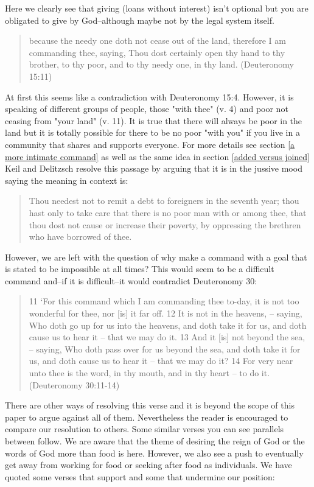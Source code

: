 \documentclass[11pt]{article}
\begin{document}
\noindent Here we clearly see that giving (loans without interest) isn't optional but you are obligated to give by God--although maybe not by the legal system itself.
\begin{quote}
because the needy one doth not cease out of the land, therefore I am commanding thee, saying, Thou dost certainly open thy hand to thy brother, to thy poor, and to thy needy one, in thy land. (Deuteronomy 15:11)
\end{quote}
At first this seems like a contradiction with Deuteronomy 15:4. However, it is speaking of different groups of people, those "with thee" (v. 4) and poor not ceasing from "your land" (v. 11). It is true that there will always be poor in the land but it is totally possible for there to be no poor "with you" if you live in a community that shares and supports everyone. For more details see section \ref{a more intimate command} as well as the same idea in section \ref{added versus joined}
Keil and Delitzsch resolve this passage by arguing that it is in the jussive mood saying the meaning in context is: 
\begin{quote}
Thou needest not to remit a debt to foreigners in the seventh year; thou hast only to take care that there is no poor man with or among thee, that thou dost not cause or increase their poverty, by oppressing the brethren who have borrowed of thee. \cite{jussive mood kd}
\end{quote}
However, we are left with the question of why make a command with a goal that is stated to be impossible at all times? This would seem to be a difficult command and--if it is difficult--it would contradict Deuteronomy 30:
\begin{quote}
11 `For this command which I am commanding thee to-day, it is not too wonderful for thee, nor [is] it far off.
12 It is not in the heavens, -- saying, Who doth go up for us into the heavens, and doth take it for us, and doth cause us to hear it -- that we may do it.
13 And it [is] not beyond the sea, -- saying, Who doth pass over for us beyond the sea, and doth take it for us, and doth cause us to hear it -- that we may do it?
14 For very near unto thee is the word, in thy mouth, and in thy heart -- to do it. (Deuteronomy 30:11-14)
\end{quote}
There are other ways of resolving this verse and it is beyond the scope of this paper to argue against all of them. Nevertheless the reader is encouraged to compare our resolution to others. Some similar verses you can see parallels between follow. We are aware that the theme of desiring the reign of God or the words of God more than food is here. However, we also see a push to eventually get away from working for food or seeking after food as individuals. We have quoted some verses that support and some that undermine our position:
\end{document}
